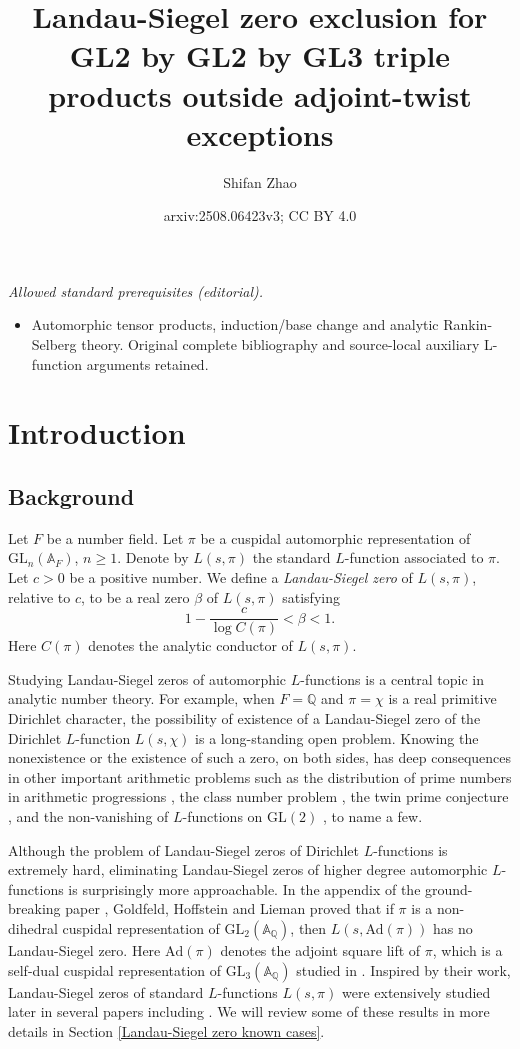 \documentclass[12pt]{amsart}
\title{Landau-Siegel zero exclusion for GL2 by GL2 by GL3 triple products outside adjoint-twist exceptions}
\author{Shifan Zhao}
\date{arxiv:2508.06423v3; CC BY 4.0}
\newcommand{\bA}{\mathbb{A}}
\newcommand{\Ad}{\text{Ad}}
\newcommand{\bQ}{\mathbb{Q}}
\newcommand{\GL}{\text{GL}}
\begin{document}
\maketitle
\noindent\textit{Allowed standard prerequisites (editorial).}\begin{itemize}
\item Automorphic tensor products, induction/base change and analytic Rankin-Selberg theory. Original complete bibliography and source-local auxiliary L-function arguments retained.
\end{itemize}\medskip
\section{Introduction}

\subsection{Background}
Let $F$ be a number field. Let $\pi$ be a cuspidal automorphic representation of $\GL_n(\bA_F)$, $n \geq 1$. Denote by $L(s,\pi)$ the standard $L$-function associated to $\pi$. Let $c>0$ be a positive number. We define a \textit{Landau-Siegel zero} of $L(s,\pi)$, relative to $c$, to be a real zero $\beta$ of $L(s,\pi)$ satisfying
\begin{equation*}
    1-\frac{c}{\log C(\pi)} < \beta < 1.
\end{equation*}
Here $C(\pi)$ denotes the analytic conductor of $L(s,\pi)$.

Studying Landau-Siegel zeros of automorphic $L$-functions is a central topic in analytic number theory. For example, when $F = \bQ$ and $\pi = \chi$ is a real primitive Dirichlet character, the possibility of existence of a Landau-Siegel zero of the Dirichlet $L$-function $L(s,\chi)$ is a long-standing open problem. Knowing the nonexistence or the existence of such a zero, on both sides, has deep consequences in other important arithmetic problems such as the distribution of prime numbers in arithmetic progressions \cite{Davenportbook}, the class number problem \cite{Davenportbook}, the twin prime conjecture \cite{Heath-Brown1983}, and the non-vanishing of $L$-functions on $\GL(2)$ \cite{IwaniecSarnak2000}, to name a few.

Although the problem of Landau-Siegel zeros of Dirichlet $L$-functions is extremely hard, eliminating Landau-Siegel zeros of higher degree automorphic $L$-functions is surprisingly more approachable. In the appendix of the ground-breaking paper \cite{HoffsteinLockhart1994}, Goldfeld, Hoffstein and Lieman proved that if $\pi$ is a non-dihedral cuspidal representation of $\GL_2(\bA_\bQ)$, then $L(s,\Ad(\pi))$ has no Landau-Siegel zero. Here $\Ad(\pi)$ denotes the adjoint square lift of $\pi$, which is a self-dual cuspidal representation of $\GL_3(\bA_\bQ)$ studied in \cite{GelbartJacquet1978}. Inspired by their work, Landau-Siegel zeros of standard $L$-functions $L(s,\pi)$ were extensively studied later in several papers including \cite{HoffsteinRamakrishnan1995}\cite{Banks1997}\cite{Thorner2021}\cite{Luo2023}. We will review some of these results in more details in Section \ref{Landau-Siegel zero known cases}.
\end{document}

